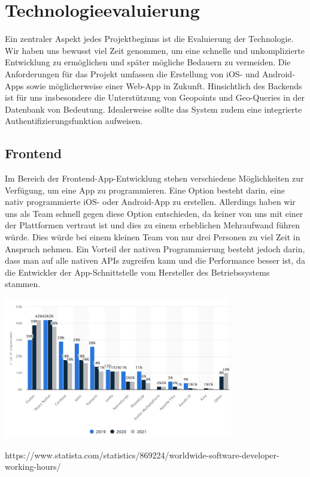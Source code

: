 \author{Martin Hausleitner}
\section{Technologieevaluierung}

Ein zentraler Aspekt jedes Projektbeginns ist die Evaluierung der Technologie. Wir haben uns bewusst viel Zeit genommen, um eine schnelle und unkomplizierte Entwicklung zu ermöglichen und später mögliche Bedauern zu vermeiden. Die Anforderungen für das Projekt umfassen die Erstellung von iOS- und Android-Apps sowie möglicherweise einer Web-App in Zukunft. Hinsichtlich des Backends ist für uns insbesondere die Unterstützung von Geopoints und Geo-Queries in der Datenbank von Bedeutung. Idealerweise sollte das System zudem eine integrierte Authentifizierungsfunktion aufweisen.


\subsection{Frontend}

Im Bereich der Frontend-App-Entwicklung stehen verschiedene Möglichkeiten zur Verfügung, um eine App zu programmieren. Eine Option besteht darin, eine nativ programmierte iOS- oder Android-App zu erstellen. Allerdings haben wir uns als Team schnell gegen diese Option entschieden, da keiner von uns mit einer der Plattformen vertraut ist und dies zu einem erheblichen Mehraufwand führen würde. Dies würde bei einem kleinen Team von nur drei Personen zu viel Zeit in Anspruch nehmen. Ein Vorteil der nativen Programmierung besteht jedoch darin, dass man auf alle nativen APIs zugreifen kann und die Performance besser ist, da die Entwickler der App-Schnittstelle vom Hersteller des Betriebssystems stammen.

\includegraphics[width=0.75\textwidth]{pics/cross-platform-statisitics.png}

https://www.statista.com/statistics/869224/worldwide-software-developer-working-hours/

